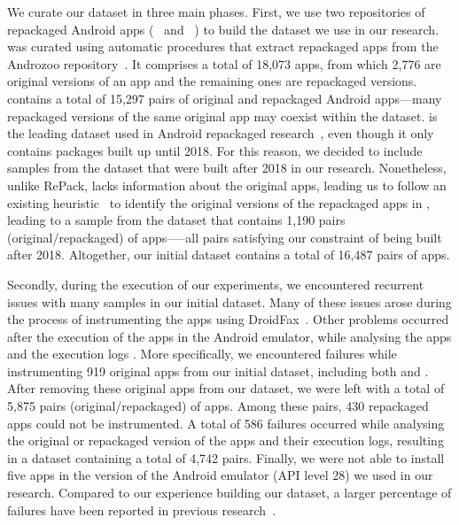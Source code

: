 We curate our dataset in three main phases. 
First, we use two repositories of repackaged Android apps (\repack~\cite{DBLP:journals/tse/LiBK21} and \amc~\cite{rafiq2022andromalpack}) to build the
dataset we use in our research. \repack was curated using automatic procedures that extract repackaged apps from the Androzoo
repository~\cite{DBLP:conf/msr/AllixBKT16}. It comprises a total of 18,073 apps, from which 2,776 are original versions of an app and the remaining ones are repackaged versions. \repack contains a total of 15,297 pairs of original and repackaged Android
apps---many repackaged versions of the same original app may coexist within the \repack dataset. \repack is the leading dataset used in Android
repackaged research~\cite{DBLP:journals/ese/KhanmohammadiEH19}, even though it only contains packages built up until 2018. For this reason, we decided to include samples from the \amc
dataset that were built after 2018 in our research. Nonetheless, unlike RePack, \amc lacks information about the original apps, leading
us to follow an existing heuristic~\cite{DBLP:journals/tse/LiBK21} to identify the original versions of the repackaged apps in \amc,
leading to a sample from the \amc dataset that contains 1,190 pairs (original/repackaged) of apps—--all pairs
satisfying our constraint of being built after 2018. Altogether, our initial dataset contains a total of 16,487 pairs of apps.


Secondly, during the execution of our experiments, we encountered recurrent issues with many samples in our initial dataset. Many of these issues arose during the process of instrumenting the apps using DroidFax~\cite{DBLP:conf/icsm/CaiR17a}.
Other problems occurred after the execution of the apps in the Android emulator, while analysing the apps and the execution logs .
More specifically, we encountered failures while instrumenting 919 original apps from our initial dataset, including both \repack and \amc. After removing these original apps
from our dataset, we were left with a total of 5,875 pairs (original/repackaged) of apps. Among these pairs, 430 repackaged apps could not be instrumented.
A total of 586 failures occurred while analysing the original or repackaged version of the apps and their execution logs, resulting in a dataset containing a total of 4,742 pairs.
Finally, we were not able to install five apps in the version of the Android emulator (API level 28) we used in our research.
Compared to our experience building our dataset, a larger percentage of failures have been reported in previous research~\cite{DBLP:conf/wcre/BaoLL18}.



